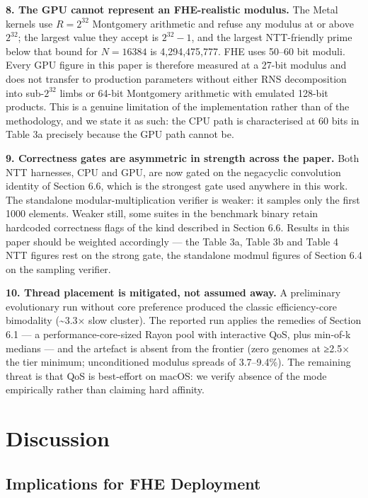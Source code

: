 \textbf{8. The GPU cannot represent an FHE-realistic modulus.} The Metal kernels use \(R = 2^{32}\) Montgomery arithmetic and refuse any modulus at or above \(2^{32}\); the largest value they accept is \(2^{32} - 1\), and the largest NTT-friendly prime below that bound for \(N = 16384\) is 4,294,475,777. FHE uses 50--60 bit moduli. Every GPU figure in this paper is therefore measured at a 27-bit modulus and does not transfer to production parameters without either RNS decomposition into sub-\(2^{32}\) limbs or 64-bit Montgomery arithmetic with emulated 128-bit products. This is a genuine limitation of the implementation rather than of the methodology, and we state it as such: the CPU path is characterised at 60 bits in Table 3a precisely because the GPU path cannot be.

\textbf{9. Correctness gates are asymmetric in strength across the paper.} Both NTT harnesses, CPU and GPU, are now gated on the negacyclic convolution identity of Section 6.6, which is the strongest gate used anywhere in this work. The standalone modular-multiplication verifier is weaker: it samples only the first 1000 elements. Weaker still, some suites in the benchmark binary retain hardcoded correctness flags of the kind described in Section 6.6. Results in this paper should be weighted accordingly --- the Table 3a, Table 3b and Table 4 NTT figures rest on the strong gate, the standalone modmul figures of Section 6.4 on the sampling verifier.

\textbf{10. Thread placement is mitigated, not assumed away.} A preliminary evolutionary run without core preference produced the classic efficiency-core bimodality (\textasciitilde3.3× slow cluster). The reported run applies the remedies of Section 6.1 --- a performance-core-sized Rayon pool with interactive QoS, plus min-of-k medians --- and the artefact is absent from the frontier (zero genomes at ≥2.5× the tier minimum; unconditioned modulus spreads of 3.7--9.4\%). The remaining threat is that QoS is best-effort on macOS: we verify absence of the mode empirically rather than claiming hard affinity.

\section{Discussion}\label{discussion}

\subsection{Implications for FHE Deployment}\label{implications-for-fhe-deployment}

